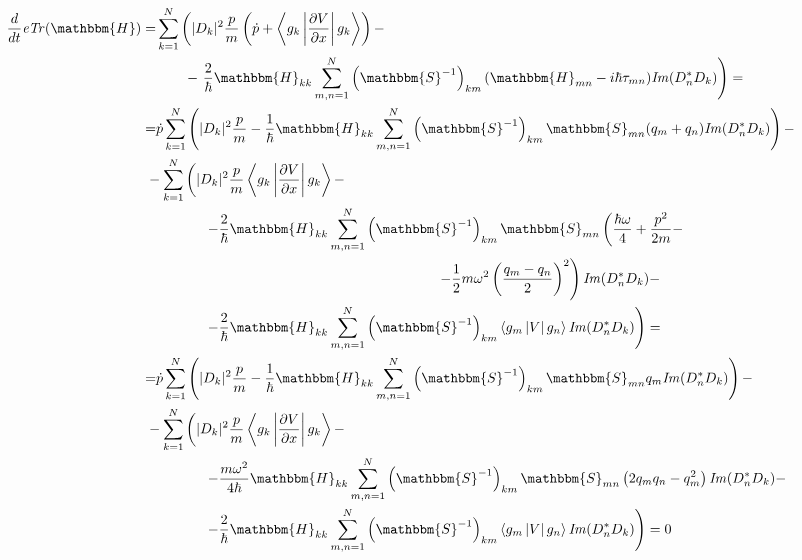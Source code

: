 \begin{align*}
\frac{d}{dt}\mathit{eTr}(\mathbbm{H}) = & \sum_{k=1}^N\left(|D_k|^2%
							    \frac{p}{m}%
							    \left(\dot{p}+%
								  \mymean{g_k}%
									 {\frac{\partial V}%
									       {\partial x}}%
									 {g_k}%
							    \right)-\right. \\
 					&\qquad-\left.\frac{2}{\hbar}\mathbbm{H}_{kk}%
							    \sum_{m,n=1}^N\left(\mathbbm{S}^{-1}\right)_{km}%
									  (\mathbbm{H}_{mn}-i\hbar\tau_{mn})%
									  \mathit{Im}(D_n^*D_k)%
						      \right)=\\
= & \dot{p}\sum_{k=1}^N\left(|D_k|^2\frac{p}{m}-%
			   \frac{1}{\hbar}\mathbbm{H}_{kk}\sum_{m,n=1}^N\left(\mathbbm{S}^{-1}\right)_{km}%
									\mathbbm{S}_{mn}(q_m+q_n)\mathit{Im}(D_n^*D_k)%
		       \right)-\\
&\hspace{-0.25cm}-\sum_{k=1}^N\left(|D_k|^2\frac{p}{m}\mymean{g_k}{\frac{\partial V}{\partial x}}{g_k}-\right.\\
&\hspace{1.2cm}\left.	     -\frac{2}{\hbar}\mathbbm{H}_{kk}\sum_{m,n=1}^N\left(\mathbbm{S}^{-1}\right)_{km}\mathbbm{S}_{mn}%
								    \left(\frac{\hbar\omega}{4}+%
									  \frac{p^2}{2m}-\right.\right.\\
&\hspace{7cm}\left.\left.						 -\frac{1}{2}m\omega^2\left(\frac{q_m-q_n}{2}\right)^2\right)\mathit{Im}(D_n^*D_k)-\right.\\
&\hspace{1.2cm}\left. 	     -\frac{2}{\hbar}\mathbbm{H}_{kk}\sum_{m,n=1}^N\left(\mathbbm{S}^{-1}\right)_{km}\mymean{g_m}{V}{g_n}\mathit{Im}(D_n^*D_k)\right)=\\
= & \dot{p}\sum_{k=1}^N\left(|D_k|^2\frac{p}{m}-%
			   \frac{1}{\hbar}\mathbbm{H}_{kk}\sum_{m,n=1}^N\left(\mathbbm{S}^{-1}\right)_{km}%
									\mathbbm{S}_{mn}q_m\mathit{Im}(D_n^*D_k)%
		       \right)-\\
&\hspace{-0.25cm}-\sum_{k=1}^N\left(|D_k|^2\frac{p}{m}\mymean{g_k}{\frac{\partial V}{\partial x}}{g_k}-\right.\\
&\hspace{1.2cm}\left.	     -\frac{m\omega^2}{4\hbar}\mathbbm{H}_{kk}\sum_{m,n=1}^N\left(\mathbbm{S}^{-1}\right)_{km}\mathbbm{S}_{mn}%
								    \left(2q_mq_n-q_m^2\right)\mathit{Im}(D_n^*D_k)-\right.\\
&\hspace{1.2cm}\left. 	     -\frac{2}{\hbar}\mathbbm{H}_{kk}\sum_{m,n=1}^N\left(\mathbbm{S}^{-1}\right)_{km}\mymean{g_m}{V}{g_n}\mathit{Im}(D_n^*D_k)\right)=0
\end{align*}

